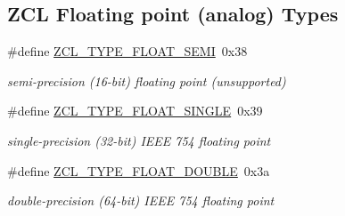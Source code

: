 \subsection*{Z\+CL Floating point (analog) Types}
\begin{DoxyCompactItemize}
\item 
\mbox{\label{group__zcl__types_ga8b1e3e1ec66f72995346c295e8ba3fe7}} 
\#define \hyperlink{group__zcl__types_ga8b1e3e1ec66f72995346c295e8ba3fe7}{Z\+C\+L\+\_\+\+T\+Y\+P\+E\+\_\+\+F\+L\+O\+A\+T\+\_\+\+S\+E\+MI}~0x38
\begin{DoxyCompactList}\small\item\em semi-\/precision (16-\/bit) floating point (unsupported) \end{DoxyCompactList}\item 
\mbox{\label{group__zcl__types_ga4b22fe5da2b5395e0cbd178054702602}} 
\#define \hyperlink{group__zcl__types_ga4b22fe5da2b5395e0cbd178054702602}{Z\+C\+L\+\_\+\+T\+Y\+P\+E\+\_\+\+F\+L\+O\+A\+T\+\_\+\+S\+I\+N\+G\+LE}~0x39
\begin{DoxyCompactList}\small\item\em single-\/precision (32-\/bit) I\+E\+EE 754 floating point \end{DoxyCompactList}\item 
\mbox{\label{group__zcl__types_ga447b33931d4cb320761a0e5034f494b2}} 
\#define \hyperlink{group__zcl__types_ga447b33931d4cb320761a0e5034f494b2}{Z\+C\+L\+\_\+\+T\+Y\+P\+E\+\_\+\+F\+L\+O\+A\+T\+\_\+\+D\+O\+U\+B\+LE}~0x3a
\begin{DoxyCompactList}\small\item\em double-\/precision (64-\/bit) I\+E\+EE 754 floating point \end{DoxyCompactList}\end{DoxyCompactItemize}
